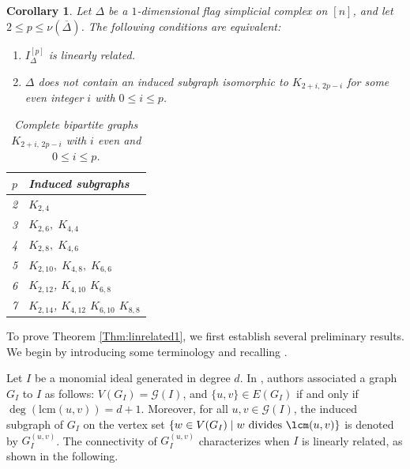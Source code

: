 \documentclass[12pt]{amsart}
\newcommand{\cG}{\mathcal{G}}
\newtheorem{Corollary}[Theorem]{Corollary}
\begin{document}
\begin{Corollary}\label{coro: lin related}
Let $\Delta$ be a $1$-dimensional flag simplicial complex on $[n]$, and let
$2 \leq p \leq \nu(\overline{\Delta})$. The following conditions are equivalent:
\begin{enumerate}
    \item $I_{\Delta}^{[p]}$ is linearly related.
    \item $\Delta$ does not contain an induced subgraph isomorphic to $K_{2+i,\,2p-i}$ for some even integer $i$ with $0 \leq i \leq p$.
\end{enumerate}

\begin{table}[h]
\centering
\begin{tabular}{c|l}
$p$ & Induced subgraphs \\ \hline
2 & $K_{2,4}$ \\
3 & $K_{2,6},\; K_{4,4}$ \\
4 & $K_{2,8},\; K_{4,6}$ \\
5 & $K_{2,10},\; K_{4,8},\; K_{6,6}$\\
6 & $K_{2,12}$, \; $K_{4,10}$ \; $K_{6,8}$\\
7 & $K_{2,14}$, \; $K_{4,12}$ \; $K_{6,10}$ \; $K_{8,8}$\\
\end{tabular}
\caption{Complete bipartite graphs $K_{2+i,\,2p-i}$ with $i$ even and $0 \leq i \leq p$.}
\end{table}
\end{Corollary}






To prove Theorem \ref{Thm:linrelated1}, we first establish several preliminary results. We begin by introducing some terminology and recalling \cite[Corollary 2.2]{BHZ}.

 Let $I$ be a monomial ideal generated in degree $d$. In \cite{BHZ}, authors associated a graph $G_I$ to $I$ as follows: $V(G_I)=\cG(I)$, and  $\{u,v\} \in E(G_I)$ if and only if $\deg(\mathrm{lcm}(u,v))=d+1$. Moreover, for all $u,v\in \cG(I)$, the induced subgraph of $G_I$ on the vertex set $\{w\in V(G_I)\mid w\text{ divides } \lcm(u,v)\}$ is denoted by $G^{(u,v)}_{I}$. The connectivity of $G^{(u,v)}_{I}$ characterizes when $I$ is linearly related, as shown in the following. 
  
\end{document}
